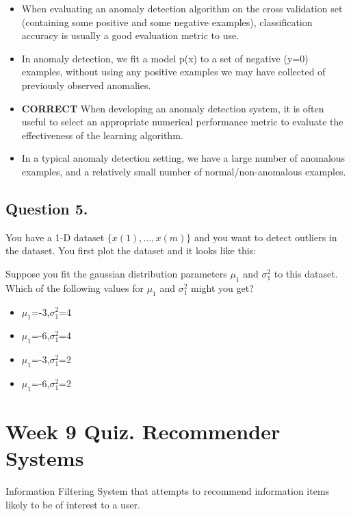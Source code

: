 \documentclass[11pt]{article} %
\begin{document}
\begin{itemize}
	\item When evaluating an anomaly detection algorithm on the cross validation set (containing some positive and some negative examples), classification accuracy is usually a good evaluation metric to use.
	\item  In anomaly detection, we fit a model p(x) to a set of negative (y=0) examples, without using any positive examples we may have collected of previously observed anomalies.
	\item \textbf{CORRECT} When developing an anomaly detection system, it is often useful to select an appropriate numerical performance metric to evaluate the effectiveness of the learning algorithm.
	\item In a typical anomaly detection setting, we have a large number of anomalous examples, and a relatively small number of normal/non-anomalous examples.
\end{itemize}
\subsection*{Question 5. }
You have a 1-D dataset $\{x(1),\ldots,x(m)\}$ and you want to detect outliers in the dataset. You first plot the dataset and it looks like this:


Suppose you fit the gaussian distribution parameters $\mu_1$ and $\sigma^2_1$ to this dataset. Which of the following values for $\mu_1$ and $\sigma^2_1$ might you get?
\begin{itemize}
	\item $\mu_1$=-3,$\sigma^2_1$=4
	\item 
	$\mu_1$=-6,$\sigma^2_1$=4
	\item
	$\mu_1$=-3,$\sigma^2_1$=2
	\item 
	$\mu_1$=-6,$\sigma^2_1$=2
\end{itemize}




\section{Week 9 Quiz. Recommender Systems}

Information Filtering System that attempts to recommend information items likely
to be of interest to a user.
\end{document}
